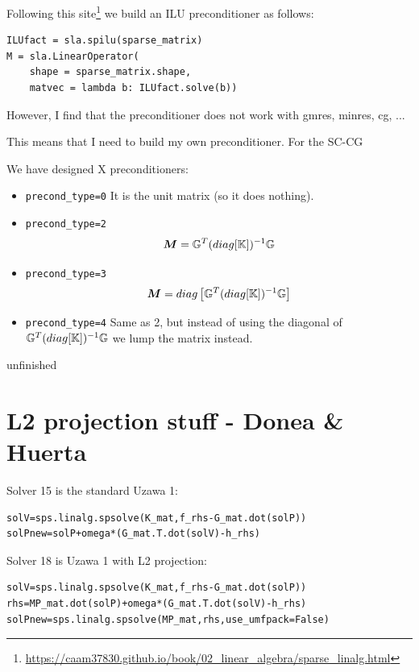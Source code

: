 Following this site\footnote{\url{https://caam37830.github.io/book/02_linear_algebra/sparse_linalg.html}}
we build an ILU preconditioner as follows:
\begin{lstlisting}
ILUfact = sla.spilu(sparse_matrix)
M = sla.LinearOperator(
    shape = sparse_matrix.shape,
    matvec = lambda b: ILUfact.solve(b))
\end{lstlisting}
However, I find that the preconditioner does not work with gmres, minres, cg, ...

This means that I need to build my own preconditioner. 
For the SC-CG 

We have designed X preconditioners:
\begin{itemize}
\item {\tt precond\_type=0} It is the unit matrix (so it does nothing). 

\item {\tt precond\_type=2}
\[
{\bm M} = {\mathbb{G}}^T (diag [{\mathbb{K}}]  )^{-1} {\mathbb{G}} 
\]
\item {\tt precond\_type=3} 
\[
{\bm M} = diag \left[ {\mathbb{G}}^T (diag [{\mathbb{K}}]  )^{-1} {\mathbb{G}} \right]
\]
\item {\tt precond\_type=4} Same as 2, but instead of using the 
diagonal of $ {\mathbb{G}}^T (diag [{\mathbb{K}}]  )^{-1} {\mathbb{G}}$ we lump the matrix instead.

\end{itemize}

{\color{red} \Large unfinished}

\newpage
\section*{L2 projection stuff - Donea \& Huerta}


Solver 15 is the standard Uzawa 1:
\begin{lstlisting}
solV=sps.linalg.spsolve(K_mat,f_rhs-G_mat.dot(solP))
solPnew=solP+omega*(G_mat.T.dot(solV)-h_rhs)         
\end{lstlisting}

Solver 18 is Uzawa 1 with L2 projection:
\begin{lstlisting}
solV=sps.linalg.spsolve(K_mat,f_rhs-G_mat.dot(solP))     
rhs=MP_mat.dot(solP)+omega*(G_mat.T.dot(solV)-h_rhs)      
solPnew=sps.linalg.spsolve(MP_mat,rhs,use_umfpack=False)   
\end{lstlisting}


